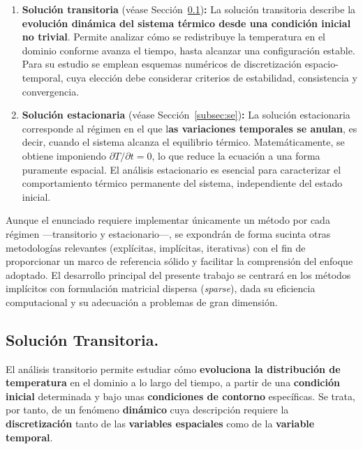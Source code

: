 \documentclass{article}
\begin{document}
\begin{enumerate}
    \item \textbf{Solución transitoria} (véase Sección~\ref{subsec:st})\textbf{:} La solución transitoria describe la \textbf{evolución dinámica del sistema térmico desde una condición inicial no trivial}. Permite analizar cómo se redistribuye la temperatura en el dominio conforme avanza el tiempo, hasta alcanzar una configuración estable. Para su estudio se emplean esquemas numéricos de discretización espacio-temporal, cuya elección debe considerar criterios de estabilidad, consistencia y convergencia.

    \item \textbf{Solución estacionaria} (véase Sección~\ref{subsec:se})\textbf{:} La solución estacionaria corresponde al régimen en el que l\textbf{as variaciones temporales se anulan}, es decir, cuando el sistema alcanza el equilibrio térmico. Matemáticamente, se obtiene imponiendo $\partial T/\partial t = 0$, lo que reduce la ecuación a una forma puramente espacial. El análisis estacionario es esencial para caracterizar el comportamiento térmico permanente del sistema, independiente del estado inicial.
\end{enumerate}

Aunque el enunciado requiere implementar únicamente un método por cada régimen —transitorio y estacionario—, se expondrán de forma sucinta otras metodologías relevantes (explícitas, implícitas, iterativas) con el fin de proporcionar un marco de referencia sólido y facilitar la comprensión del enfoque adoptado. El desarrollo principal del presente trabajo se centrará en los métodos implícitos con formulación matricial dispersa (\textit{sparse}), dada su eficiencia computacional y su adecuación a problemas de gran dimensión.

\newpage
\subsection{Solución Transitoria.}
\label{subsec:st}
El análisis transitorio permite estudiar cómo \textbf{evoluciona la distribución de temperatura} en el dominio a lo largo del tiempo, a partir de una \textbf{condición inicial} determinada y bajo unas \textbf{condiciones de contorno} específicas. Se trata, por tanto, de un fenómeno \textbf{dinámico} cuya descripción requiere la \textbf{discretización} tanto de las \textbf{variables espaciales} como de la \textbf{variable temporal}.\\
\end{document}
